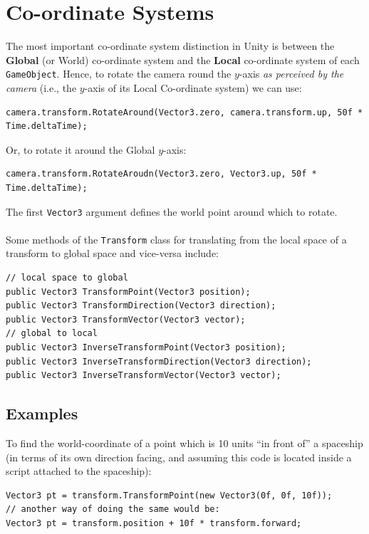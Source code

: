 \documentclass[a4paper,11pt]{article}
\begin{document}
\section{Co-ordinate Systems}    
The most important co-ordinate system distinction in Unity is between the \textbf{Global} (or World) co-ordinate system 
and the \textbf{Local} co-ordinate system of each \verb|GameObject|.
Hence, to rotate the camera round the $y$-axis \emph{as perceived by the camera} (i.e., the $y$-axis of its Local Co-ordinate
system) we can use:
\begin{verbatim}
camera.transform.RotateAround(Vector3.zero, camera.transform.up, 50f * Time.deltaTime);
\end{verbatim}

Or, to rotate it around the Global $y$-axis:
\begin{verbatim}
camera.transform.RotateAroudn(Vector3.zero, Vector3.up, 50f * Time.deltaTime);
\end{verbatim}

The first \verb|Vector3| argument defines the world point around which to rotate.
\\\\ 
Some methods of the \verb|Transform| class for translating from the local space of a transform to global space and 
vice-versa include:
\begin{verbatim}
// local space to global
public Vector3 TransformPoint(Vector3 position);
public Vector3 TransformDirection(Vector3 direction);
public Vector3 TransformVector(Vector3 vector);
// global to local
public Vector3 InverseTransformPoint(Vector3 position);
public Vector3 InverseTransformDirection(Vector3 direction);
public Vector3 InverseTransformVector(Vector3 vector);
\end{verbatim}

\subsection{Examples}
To find the world-coordinate of a point which is 10 units ``in front of'' a spaceship (in terms of its 
own direction facing, and assuming this code is located inside a script attached to the spaceship):
\begin{verbatim}
Vector3 pt = transform.TransformPoint(new Vector3(0f, 0f, 10f));
// another way of doing the same would be: 
Vector3 pt = transform.position + 10f * transform.forward;
\end{verbatim}
\end{document}
